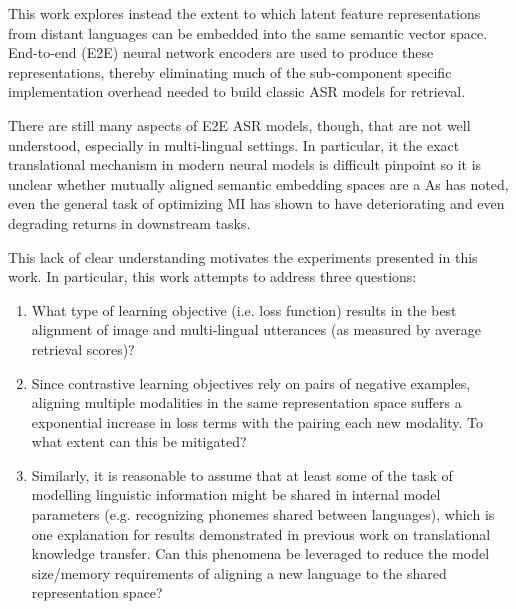 This work explores instead the extent to which latent feature representations from distant languages can be embedded into the same semantic vector space.
End-to-end (E2E) neural network encoders are used to produce these representations, thereby eliminating much of the sub-component specific implementation overhead needed to build classic ASR models for retrieval.

There are still many aspects of E2E ASR models, though, that are not well understood, especially in multi-lingual settings.
In particular, it the exact translational mechanism in modern neural models is difficult pinpoint so it is unclear whether mutually aligned semantic embedding spaces are a 
As  has noted, even the general task of optimizing MI has shown to have deteriorating and even degrading returns in downstream tasks.

This lack of clear understanding motivates the experiments presented in this work.
In particular, this work attempts to address three questions:



\begin{enumerate}
    \item What type of learning objective (i.e. loss function) results in the best alignment of image and multi-lingual utterances (as measured by average retrieval scores)?
    \item Since contrastive learning objectives rely on pairs of negative examples, aligning multiple modalities in the same representation space suffers a exponential increase in loss terms with the pairing each new modality.
To what extent can this be mitigated?

\item Similarly, it is reasonable to assume that at least some of the task of modelling linguistic information might be shared in internal model parameters (e.g. recognizing phonemes shared between languages), which is one explanation for results demonstrated in previous work on translational knowledge transfer. 
    Can this phenomena be leveraged to reduce the model size/memory requirements of aligning a new language to the shared representation space?
\end{enumerate}

